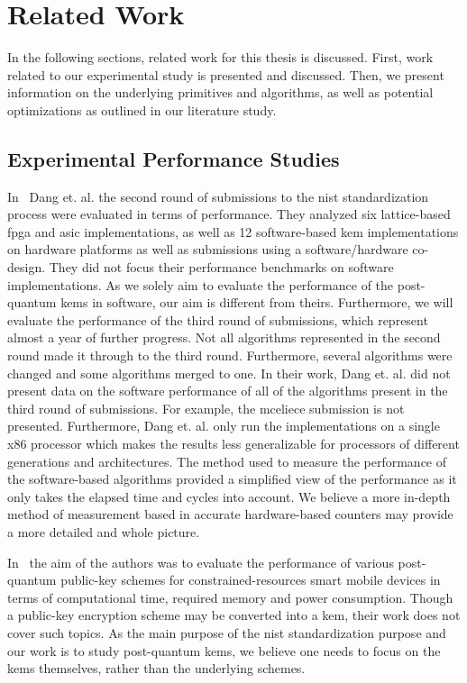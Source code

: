 \chapter{Related Work}
\label{chapter:related-work}

In the following sections, related work for this thesis is discussed. First, work related to our experimental study is presented and discussed. Then, we present information on the underlying primitives and algorithms, as well as potential optimizations as outlined in our literature study.

\section{Experimental Performance Studies}

\noindent In~\cite{viet2020} Dang et. al. the second round of submissions to the \gls{nist} standardization process were evaluated in terms of performance. They analyzed six lattice-based \gls{fpga} and \gls{asic} implementations, as well as 12 software-based \gls{kem} implementations on hardware platforms as well as submissions using a software/hardware co-design. They did not focus their performance benchmarks on software implementations. As we solely aim to evaluate the performance of the \gls{post-quantum} \glspl{kem} in software, our aim is different from theirs. Furthermore, we will evaluate the performance of the third round of submissions, which represent almost a year of further progress. Not all algorithms represented in the second round made it through to the third round. Furthermore, several algorithms were changed and some algorithms merged to one. In their work, Dang et. al. did not present data on the software performance of all of the algorithms present in the third round of submissions. For example, the \gls{mceliece} submission is not presented. Furthermore, Dang et. al. only run the implementations on a single \gls{x86} processor which makes the results less generalizable for processors of different generations and architectures. The method used to measure the performance of the software-based algorithms provided a simplified view of the performance as it only takes the elapsed time and cycles into account. We believe a more in-depth method of measurement based in accurate hardware-based counters may provide a more detailed and whole picture.

In~\cite{chikouche2018} the aim of the authors was to evaluate the performance of various \gls{post-quantum} public-key schemes for constrained-resources smart mobile devices in terms of computational time, required memory and power consumption. Though a public-key encryption scheme may be converted into a \gls{kem}, their work does not cover such topics. As the main purpose of the \gls{nist} standardization purpose and our work is to study \gls{post-quantum} \glspl{kem}, we believe one needs to focus on the \glspl{kem} themselves, rather than the underlying schemes.

